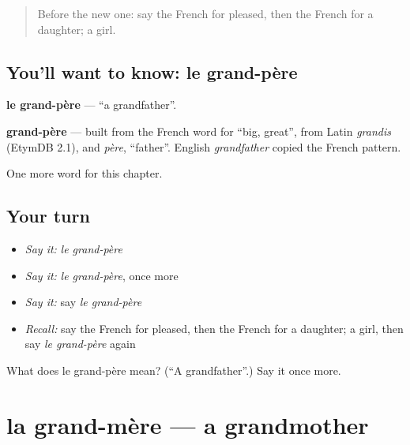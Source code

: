 \label{lesson:FR-C56-grand-pere}



\begin{quote}
Before the new one: say the French for pleased, then the French for a daughter; a girl.
\end{quote}

\subsection*{You'll want to know: le grand-père}
\textbf{le grand-père} — \textquotedblleft{}a grandfather\textquotedblright{}.

\begin{cousinweb}
\textbf{grand-père} — built from the French word for \textquotedblleft{}big, great\textquotedblright{}, from Latin \emph{grandis} (EtymDB 2.1), and \emph{père}, \textquotedblleft{}father\textquotedblright{}. English \emph{grandfather} copied the French pattern.
\end{cousinweb}

\begin{grammarlens}[title={What you've built}]
One more word for this chapter.
\end{grammarlens}

\subsection*{Your turn}
\begin{itemize}
\raggedright
  \item \emph{Say it:} \emph{le grand-père}
  \item \emph{Say it:} \emph{le grand-père}, once more
  \item \emph{Say it:} say \emph{le grand-père}
  \item \emph{Recall:} say the French for pleased, then the French for a daughter; a girl, then say \emph{le grand-père} again
\end{itemize}

\begin{tcolorbox}[breakable,colback=teal!4,colframe=teal!35!black,title={Before you move on}]
What does le grand-père mean? (\textquotedblleft{}A grandfather\textquotedblright{}.) Say it once more.
\end{tcolorbox}
\section[la grand-mère]{la grand-mère — a grandmother}

